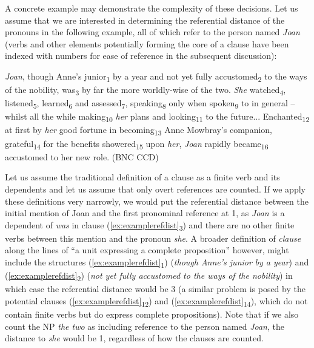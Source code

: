 A concrete example may demonstrate the complexity of these decisions. Let us assume that we are interested in determining the referential distance  of the pronouns  in the following example, all of which refer to the person named \textit{Joan} (verbs  and other elements potentially forming the core of a clause have been indexed with numbers for ease of reference in the subsequent discussion):

\begin{exe}
\ex \textit{Joan}, though Anne's junior\textsubscript{1} by a year and not yet fully accustomed\textsubscript{2} to the ways of the nobility, was\textsubscript{3} by far the more worldly\hyp{}wise of the two. \textit{She} watched\textsubscript{4}, listened\textsubscript{5}, learned\textsubscript{6} and assessed\textsubscript{7}, speaking\textsubscript{8} only when spoken\textsubscript{9} to in general -- whilst all the while making\textsubscript{10} \textit{her} plans and looking\textsubscript{11} to the future... Enchanted\textsubscript{12} at first by \textit{her} good fortune in becoming\textsubscript{13} Anne Mowbray's companion, grateful\textsubscript{14} for the benefits showered\textsubscript{15} upon \textit{her}, \textit{Joan} rapidly became\textsubscript{16} accustomed to her new role. (BNC CCD)
\label{ex:examplerefdist}
\end{exe}

Let us assume the traditional definition of a clause as a finite verb  and its dependents and let us assume that only overt references are counted. If we apply these definitions very narrowly, we would put the referential distance  between the initial mention of Joan and the first pronominal  reference at 1, as \textit{Joan} is a dependent of \textit{was} in clause (\ref{ex:examplerefdist}\textsubscript{3}) and there are no other finite verbs between this mention and the pronoun \textit{she}. A broader definition of \textit{clause} along the lines of ``a unit expressing a complete proposition'' however, might include the structures (\ref{ex:examplerefdist}\textsubscript{1}) (\textit{though Anne's junior} \textit{by a year}) and (\ref{ex:examplerefdist}\textsubscript{2}) (\textit{not yet fully accustomed to the ways of the nobility}) in which case the referential distance  would be 3 (a similar problem is posed by the potential clauses (\ref{ex:examplerefdist}\textsubscript{12}) and (\ref{ex:examplerefdist}\textsubscript{14}), which do not contain finite verbs  but do express complete propositions). Note that if we also count the NP \textit{the two} as including reference to the person named \textit{Joan}, the distance  to \textit{she} would be 1, regardless of how the clauses are counted.

